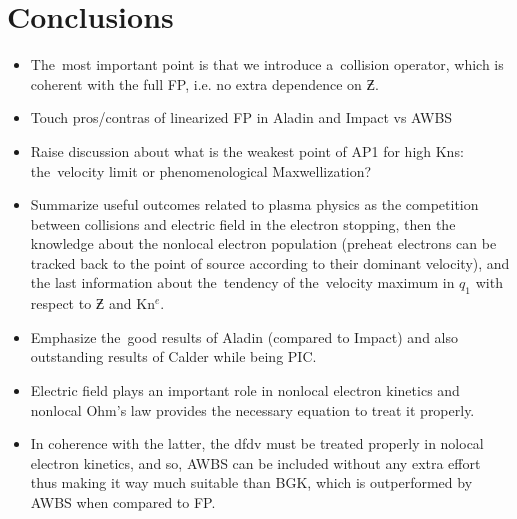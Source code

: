 \section{Conclusions}
\label{sec:Conclusions}

\begin{itemize}
  \item The~most important point is that we introduce a~collision operator, 
    which is coherent with the full FP, i.e. no extra dependence on $\Zbar$.
  \item Touch pros/contras of linearized FP in Aladin and Impact vs AWBS
  \item Raise discussion about what is the weakest point of AP1 for high Kns: 
    the~velocity limit or phenomenological Maxwellization?
  \item Summarize useful outcomes related to plasma physics as
    the competition between collisions and electric field in the electron 
	stopping, then the knowledge about the nonlocal electron population 
	(preheat electrons can be tracked back to the point of source according 
	to their dominant velocity), and the last information about the~tendency 
	of the~velocity maximum in $q_1$ with respect to $\Zbar$ and Kn$^e$.
  \item Emphasize the~good results of Aladin (compared to Impact) and also
    outstanding results of Calder while being PIC. 
  \item Electric field plays an important role in nonlocal electron kinetics
    and nonlocal Ohm's law provides the necessary equation to treat it properly.
  \item In coherence with the latter, the dfdv must be treated properly in
    nolocal electron kinetics, and so, AWBS can be included without any extra
	effort thus making it way much suitable than BGK, which is outperformed
	by AWBS when compared to FP.

\end{itemize}

